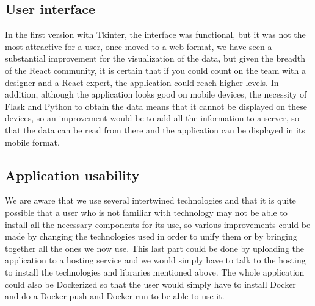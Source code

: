 \subsection*{User interface}
In the first version with Tkinter, the interface was functional, but it was not the most attractive for a user, once moved to a web format, we have seen a substantial improvement for the visualization of the data, but given the breadth of the React community, it is certain that if you could count on the team with a designer and a React expert, the application could reach higher levels. In addition, although the application looks good on mobile devices, the necessity of Flask and Python to obtain the data means that it cannot be displayed on these devices, so an improvement would be to add all the information to a server, so that the data can be read from there and the application can be displayed in its mobile format.

\subsection*{Application usability}
We are aware that we use several intertwined technologies and that it is quite possible that a user who is not familiar with technology may not be able to install all the necessary components for its use, so various improvements could be made by changing the technologies used in order to unify them or by bringing together all the ones we now use. This last part could be done by uploading the application to a hosting service and we would simply have to talk to the hosting to install the technologies and libraries mentioned above. The whole application could also be Dockerized so that the user would simply have to install Docker and do a Docker push and Docker run to be able to use it.

